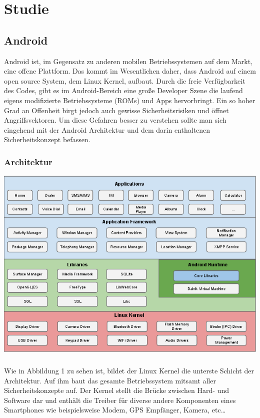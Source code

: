 \chapter{Studie}
\section{Android}
Android ist, im Gegensatz zu anderen mobilen Betriebssystemen auf dem Markt, eine offene Plattform. Das kommt im Wesentlichen daher, dass Android auf einem open source System, dem Linux Kernel, aufbaut. Durch die freie Verfügbarkeit des Codes, gibt es im Android-Bereich eine große Developer Szene die laufend eigens modifizierte Betriebssysteme (ROMs) und Apps hervorbringt.
Ein so hoher Grad an Offenheit birgt jedoch auch gewisse Sicherheitsrisiken und öffnet Angriffsvektoren. Um diese Gefahren besser zu verstehen sollte man sich eingehend mit der Android Architektur und dem darin enthaltenen Sicherheitskonzept befassen.

\subsection{Architektur}
\includegraphics[scale=0.7]{Images/android_stack}
\paragraph*{}
Wie in Abbildung 1 zu sehen ist, bildet der Linux Kernel die unterste Schicht der Architektur. Auf ihm baut das gesamte Betriebssystem mitsamt aller Sicherheitskonzepte auf. Der Kernel stellt die Brücke zwischen Hard- und Software dar und enthält die Treiber für diverse andere Komponenten eines Smartphones wie beispielsweise Modem, GPS Empfänger, Kamera, etc… 
